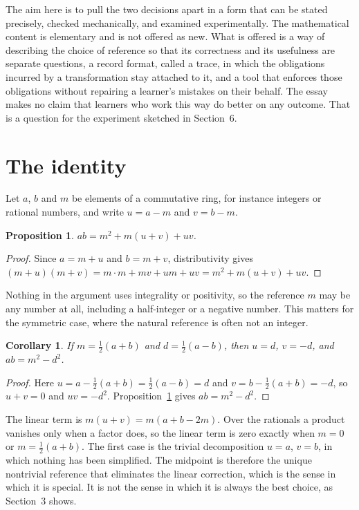 \documentclass[11pt]{article}
\newtheorem{proposition}{Proposition}
\newtheorem{corollary}{Corollary}
\theoremstyle{definition}
\theoremstyle{remark}
\begin{document}
The aim here is to pull the two decisions apart in a form that can be stated precisely, checked mechanically, and examined experimentally. The mathematical content is elementary and is not offered as new. What is offered is a way of describing the choice of reference so that its correctness and its usefulness are separate questions, a record format, called a trace, in which the obligations incurred by a transformation stay attached to it, and a tool that enforces those obligations without repairing a learner's mistakes on their behalf. The essay makes no claim that learners who work this way do better on any outcome. That is a question for the experiment sketched in Section~6.

\section{The identity}

Let $a$, $b$ and $m$ be elements of a commutative ring, for instance integers or rational numbers, and write $u=a-m$ and $v=b-m$.

\begin{proposition}\label{prop:decomp}
$ab=m^2+m(u+v)+uv$.
\end{proposition}

\begin{proof}
Since $a=m+u$ and $b=m+v$, distributivity gives $(m+u)(m+v)=m\cdot m+m v+u m+u v=m^2+m(u+v)+uv$.
\end{proof}

Nothing in the argument uses integrality or positivity, so the reference $m$ may be any number at all, including a half-integer or a negative number. This matters for the symmetric case, where the natural reference is often not an integer.

\begin{corollary}\label{cor:mid}
If $m=\tfrac12(a+b)$ and $d=\tfrac12(a-b)$, then $u=d$, $v=-d$, and $ab=m^2-d^2$.
\end{corollary}

\begin{proof}
Here $u=a-\tfrac12(a+b)=\tfrac12(a-b)=d$ and $v=b-\tfrac12(a+b)=-d$, so $u+v=0$ and $uv=-d^2$. Proposition~\ref{prop:decomp} gives $ab=m^2-d^2$.
\end{proof}

The linear term is $m(u+v)=m(a+b-2m)$. Over the rationals a product vanishes only when a factor does, so the linear term is zero exactly when $m=0$ or $m=\tfrac12(a+b)$. The first case is the trivial decomposition $u=a$, $v=b$, in which nothing has been simplified. The midpoint is therefore the unique nontrivial reference that eliminates the linear correction, which is the sense in which it is special. It is not the sense in which it is always the best choice, as Section~3 shows.
\end{document}
